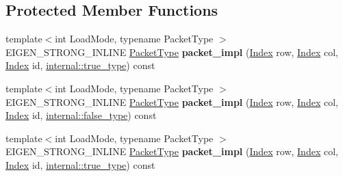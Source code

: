 \subsection*{Protected Member Functions}
\begin{DoxyCompactItemize}
\item 
\mbox{\label{struct_eigen_1_1internal_1_1diagonal__product__evaluator__base_a0c40c8d14ebec720202430c2b54ccd5c}} 
{\footnotesize template$<$int Load\+Mode, typename Packet\+Type $>$ }\\E\+I\+G\+E\+N\+\_\+\+S\+T\+R\+O\+N\+G\+\_\+\+I\+N\+L\+I\+NE \hyperlink{struct_eigen_1_1_packet_type}{Packet\+Type} {\bfseries packet\+\_\+impl} (\hyperlink{namespace_eigen_a62e77e0933482dafde8fe197d9a2cfde}{Index} row, \hyperlink{namespace_eigen_a62e77e0933482dafde8fe197d9a2cfde}{Index} col, \hyperlink{namespace_eigen_a62e77e0933482dafde8fe197d9a2cfde}{Index} id, \hyperlink{struct_eigen_1_1internal_1_1true__type}{internal\+::true\+\_\+type}) const
\item 
\mbox{\label{struct_eigen_1_1internal_1_1diagonal__product__evaluator__base_ad0c8a0b3d0df8990abbab8c091df0bca}} 
{\footnotesize template$<$int Load\+Mode, typename Packet\+Type $>$ }\\E\+I\+G\+E\+N\+\_\+\+S\+T\+R\+O\+N\+G\+\_\+\+I\+N\+L\+I\+NE \hyperlink{struct_eigen_1_1_packet_type}{Packet\+Type} {\bfseries packet\+\_\+impl} (\hyperlink{namespace_eigen_a62e77e0933482dafde8fe197d9a2cfde}{Index} row, \hyperlink{namespace_eigen_a62e77e0933482dafde8fe197d9a2cfde}{Index} col, \hyperlink{namespace_eigen_a62e77e0933482dafde8fe197d9a2cfde}{Index} id, \hyperlink{struct_eigen_1_1internal_1_1false__type}{internal\+::false\+\_\+type}) const
\item 
\mbox{\label{struct_eigen_1_1internal_1_1diagonal__product__evaluator__base_a0c40c8d14ebec720202430c2b54ccd5c}} 
{\footnotesize template$<$int Load\+Mode, typename Packet\+Type $>$ }\\E\+I\+G\+E\+N\+\_\+\+S\+T\+R\+O\+N\+G\+\_\+\+I\+N\+L\+I\+NE \hyperlink{struct_eigen_1_1_packet_type}{Packet\+Type} {\bfseries packet\+\_\+impl} (\hyperlink{namespace_eigen_a62e77e0933482dafde8fe197d9a2cfde}{Index} row, \hyperlink{namespace_eigen_a62e77e0933482dafde8fe197d9a2cfde}{Index} col, \hyperlink{namespace_eigen_a62e77e0933482dafde8fe197d9a2cfde}{Index} id, \hyperlink{struct_eigen_1_1internal_1_1true__type}{internal\+::true\+\_\+type}) const

\end{DoxyCompactItemize}
